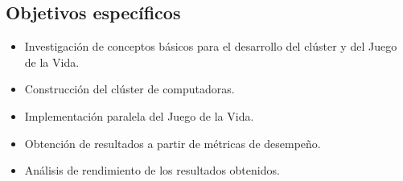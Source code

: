 \subsection{Objetivos específicos}
\label{section:objesp}

\begin{itemize}
  \item Investigación de conceptos básicos para el desarrollo del clúster y del Juego de la Vida.
  \item Construcción del clúster de computadoras.
  \item Implementación paralela del Juego de la Vida.
  \item Obtención de resultados a partir de métricas de desempeño.
  \item Análisis de rendimiento de los resultados obtenidos.
\end{itemize}
